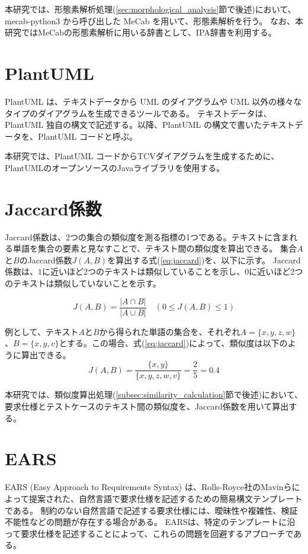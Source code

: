 本研究では、形態素解析処理(\cref{sec:morphological_analysis}節で後述)において、mecab-python3 から呼び出した MeCab を用いて、形態素解析を行う。
なお、本研究ではMeCabの形態素解析に用いる辞書として、IPA辞書\cite{mecab}を利用する。

\section{PlantUML}\label{sec:PlantUML}
PlantUML \cite{plantuml} は、テキストデータから UML \cite{uml} のダイアグラムや UML 以外の様々なタイプのダイアグラムを生成できるツールである。
テキストデータは、PlantUML 独自の構文で記述する。以降、PlantUML の構文で書いたテキストデータを、PlantUML コードと呼ぶ。

本研究では、PlantUML コードからTCVダイアグラムを生成するために、PlantUMLのオープンソースのJavaライブラリ\cite{plantuml_lib}を使用する。

\section{Jaccard係数}\label{sec:Jaccard}
Jaccard係数は、2つの集合の類似度を測る指標の1つである\cite{jaccard}。テキストに含まれる単語を集合の要素と見なすことで、テキスト間の類似度を算出できる。
集合$A$と$B$のJaccard係数$J(A,B)$を算出する式(\ref{eq:jaccard})を、以下に示す。
Jaccard係数は、$1$に近いほど2つのテキストは類似していることを示し、$0$に近いほど2つのテキストは類似していないことを示す。

\begin{equation}\label{eq:jaccard}
    J(A,B) = \frac{|A \cap B|}{|A \cup B|} \quad (0 \le J(A,B) \le 1)
\end{equation}

例として、テキスト$A$と$B$から得られた単語の集合を、それぞれ$A = \{x, y, z, w\}$、$B = \{x, y, v\}$とする。この場合、式(\ref{eq:jaccard})によって、類似度は以下のように算出できる。
\[J(A,B) = \frac{\{x, y\}}{\{x, y, z, w, v\}} = \frac{2}{5} = 0.4\]

本研究では、類似度算出処理(\ref{subsec:similarity_calculation}節で後述)において、要求仕様とテストケースのテキスト間の類似度を、Jaccard係数を用いて算出する。

\section{EARS}\label{sec:EARS}
EARS (Easy Approach to Requirements Syntax) は、Rolls-Royce社のMavinらによって提案された、自然言語で要求仕様を記述するための簡易構文テンプレートである\cite{ears}。
制約のない自然言語で記述する要求仕様には、曖昧性や複雑性、検証不能性などの問題が存在する場合がある。
EARSは、特定のテンプレートに沿って要求仕様を記述することによって、これらの問題を回避するアプローチである。

